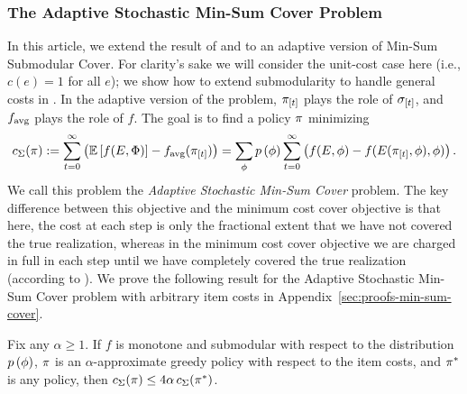 \subsubsection{The Adaptive Stochastic Min-Sum Cover Problem} In this
article, we extend the result of \citet{streeter08} and \citet{golovin08} to an
adaptive version of Min-Sum Submodular Cover. 
For clarity's sake we will consider the unit-cost case here (i.e., $c(e) = 1$ for all
$e$);  we show how to extend \term submodularity to handle general
costs in \appendixA.
In the adaptive version of the problem, $ \pi_{[{t}]} $ plays the role of
$ \sigma_{[{t}]} $, and $f_{\text{avg}}$ plays the role of $f$.  The goal is to
find a policy $\pi$ minimizing 
\begin{equation}
  \label{eqn:min-sum-obj2}
  c_{\Sigma}\! \left( {\pi} \right)  := \sum_{t =
    0}^{\infty}  \left( {\mathbb{E}\left[f(E, {\color{black}{\ensuremath{\Phi}}})\right] -
      f_{\text{avg}}( \pi_{[{t}]} )} \right)  = \sum_{{\color{black}{\ensuremath{\phi}}}} {\color{black}{\ensuremath{p \left( {{\color{black}{\ensuremath{\phi}}}} \right) }}} \sum_{t =
    0}^{\infty}  \left( {f(E, {\color{black}{\ensuremath{\phi}}}) - f(E( \pi_{[{t}]} ,
  {\color{black}{\ensuremath{\phi}}}), {\color{black}{\ensuremath{\phi}}})} \right) .
\end{equation}
We call this problem the \emph{Adaptive Stochastic Min-Sum Cover} problem.
The key difference between this objective and the minimum cost
cover objective is that here, the cost at each step is only the fractional
extent that we have not covered the true realization, whereas in the 
minimum cost cover objective we are charged in full in each step until
we have completely covered the true realization (according to
). 
We prove the following result for the Adaptive Stochastic Min-Sum Cover problem with arbitrary item costs in Appendix~\ref{sec:proofs-min-sum-cover}.

\begin{theorem}\label{thm:min-sum-set-cover}
Fix any $\alpha \ge 1$.
If $f$ is \term monotone and \term submodular with respect to the
distribution ${\color{black}{\ensuremath{p \left( {{\color{black}{\ensuremath{\phi}}}} \right) }}}$, $\pi$ is an
$\alpha$-approximate greedy policy with respect to the item costs, and $\pi^*$ is any policy,
then $c_{\Sigma}\! \left( {\pi} \right)  \le 4 \alpha \, c_{\Sigma}\! \left( {\pi^*} \right) $. 
%
%
%
%
\end{theorem}



%
%
%
%
%
